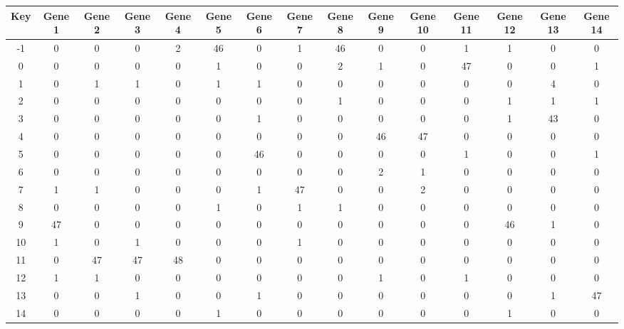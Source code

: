\begin{tabular}{|c|c|c|c|c|c|c|c|c|c|c|c|c|c|c|}
\hline
Key & Gene 1 & Gene 2 & Gene 3 & Gene 4 & Gene 5 & Gene 6 & Gene 7 & Gene 8 & Gene 9 & Gene 10 & Gene 11 & Gene 12 & Gene 13 & Gene 14 \\
\hline
-1 & 0 & 0 & 0 & 2 & 46 & 0 & 1 & 46 & 0 & 0 & 1 & 1 & 0 & 0 \\
0 & 0 & 0 & 0 & 0 & 1 & 0 & 0 & 2 & 1 & 0 & 47 & 0 & 0 & 1 \\
1 & 0 & 1 & 1 & 0 & 1 & 1 & 0 & 0 & 0 & 0 & 0 & 0 & 4 & 0 \\
2 & 0 & 0 & 0 & 0 & 0 & 0 & 0 & 1 & 0 & 0 & 0 & 1 & 1 & 1 \\
3 & 0 & 0 & 0 & 0 & 0 & 1 & 0 & 0 & 0 & 0 & 0 & 1 & 43 & 0 \\
4 & 0 & 0 & 0 & 0 & 0 & 0 & 0 & 0 & 46 & 47 & 0 & 0 & 0 & 0 \\
5 & 0 & 0 & 0 & 0 & 0 & 46 & 0 & 0 & 0 & 0 & 1 & 0 & 0 & 1 \\
6 & 0 & 0 & 0 & 0 & 0 & 0 & 0 & 0 & 2 & 1 & 0 & 0 & 0 & 0 \\
7 & 1 & 1 & 0 & 0 & 0 & 1 & 47 & 0 & 0 & 2 & 0 & 0 & 0 & 0 \\
8 & 0 & 0 & 0 & 0 & 1 & 0 & 1 & 1 & 0 & 0 & 0 & 0 & 0 & 0 \\
9 & 47 & 0 & 0 & 0 & 0 & 0 & 0 & 0 & 0 & 0 & 0 & 46 & 1 & 0 \\
10 & 1 & 0 & 1 & 0 & 0 & 0 & 1 & 0 & 0 & 0 & 0 & 0 & 0 & 0 \\
11 & 0 & 47 & 47 & 48 & 0 & 0 & 0 & 0 & 0 & 0 & 0 & 0 & 0 & 0 \\
12 & 1 & 1 & 0 & 0 & 0 & 0 & 0 & 0 & 1 & 0 & 1 & 0 & 0 & 0 \\
13 & 0 & 0 & 1 & 0 & 0 & 1 & 0 & 0 & 0 & 0 & 0 & 0 & 1 & 47 \\
14 & 0 & 0 & 0 & 0 & 1 & 0 & 0 & 0 & 0 & 0 & 0 & 1 & 0 & 0 \\
\hline
\end{tabular}